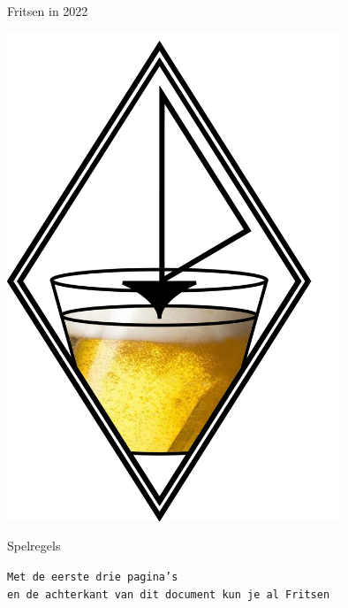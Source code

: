 \thispagestyle{empty}
\begingroup
    \fontsize{80pt}{82pt}\selectfont
    \begin{center}
        Fritsen in 2022  
    \end{center}
\endgroup

\vspace{0.55cm}

\begin{center}
    \includegraphics[width=10cm]{bier.jpeg}
\end{center}

\begingroup
    \fontsize{80pt}{82pt}\selectfont
    \begin{center}
        Spelregels  
    \end{center}
\endgroup

\vspace{0.1cm}

\begingroup
    \fontsize{30pt}{32pt}\selectfont
    \begin{center}
        \texttt{Met de eerste drie pagina's \\en de achterkant van dit document kun je al Fritsen}
    \end{center}
\endgroup

\newpage